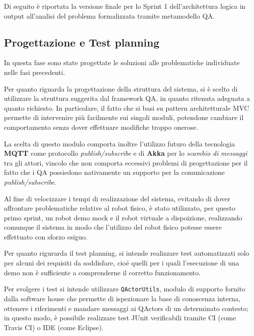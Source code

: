 Di seguito è riportata la versione finale per lo Sprint 1 dell'architettura logica in output all'analisi del problema formalizzata tramite metamodello QA\@.



\subsection{Progettazione e Test planning}

In questa fase sono state progettate le soluzioni alle problematiche individuate nelle fasi precedenti.

Per quanto riguarda la progettazione della struttura del sistema, si è scelto di utilizzare la struttura suggerita dal framework QA, in quanto ritenuta adeguata a quanto richiesto.
In particolare, il fatto che si basi su pattern architetturale MVC permette di intervenire più facilmente sui singoli moduli, potendone cambiare il comportamento senza dover effettuare modifiche troppo onerose.

La scelta di questo modulo comporta inoltre l'utilizzo futuro della tecnologia \textbf{MQTT} come protocollo \textit{publish/subscribe} e di \textbf{Akka} per lo \textit{scambio di messaggi} tra gli attori,
vincolo che non comporta eccessivi problemi di progettazione per il fatto che i QA possiedono nativamente un supporto per la comunicazione \textit{publish/subscribe}.

Al fine di velocizzare i tempi di realizzazione del sistema, evitando di dover affrontare problematiche relative al robot fisico,
è stato utilizzato, per questo primo sprint, un robot demo mock e il robot virtuale a dispoizione, realizzando comunque il sistema in modo che l'utilizzo del robot fisico potesse essere effettuato con sforzo esiguo.

Per quanto rigurarda il test planning, si intende realizzare test automatizzati solo per alcuni dei requisiti da soddisfare, cioé quelli per i quali l'esecuzione di una demo non è sufficiente a comprenderne il corretto funzionamento.

Per svolgere i test si intende utilizzare \texttt{QActorUtils}, modulo di supporto fornito dalla software house che permette di ispezionare la base di conoscenza interna, ottenere i riferimenti e mandare messaggi ai QActors di un determinato contesto;
in questo modo, è possibile realizzare test JUnit verificabili tramite CI (come Travis CI) o IDE (come Eclipse).

